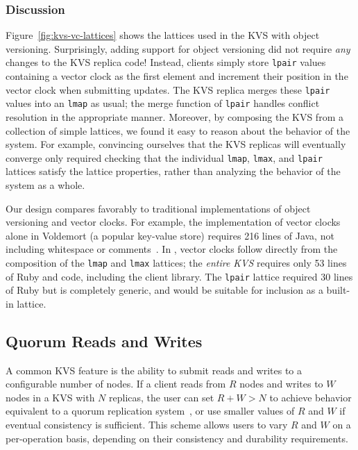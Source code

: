 \subsubsection{Discussion}
Figure~\ref{fig:kvs-vc-lattices} shows the lattices used in the KVS with object
versioning. Surprisingly, adding support for object versioning did not require
\emph{any} changes to the KVS replica code! Instead, clients simply store
\texttt{lpair} values containing a vector clock as the first element and
increment their position in the vector clock when submitting updates. The KVS
replica merges these \texttt{lpair} values into an \texttt{lmap} as usual; the
merge function of \texttt{lpair} handles conflict resolution in the appropriate
manner. Moreover, by composing the KVS from a collection of simple lattices, we
found it easy to reason about the behavior of the system. For example,
convincing ourselves that the KVS replicas will eventually converge only
required checking that the individual \texttt{lmap}, \texttt{lmax}, and
\texttt{lpair} lattices satisfy the lattice properties, rather than analyzing
the behavior of the system as a whole.

Our design compares favorably to traditional implementations of object
versioning and vector clocks. For example, the implementation of vector clocks
alone in Voldemort (a popular key-value store) requires 216 lines of Java, not
including whitespace or comments~\cite{voldemort-vector-clock}. In \lang, vector
clocks follow directly from the composition of the \texttt{lmap} and
\texttt{lmax} lattices; the \emph{entire KVS} requires only 53 lines of Ruby and \lang
code, including the client library. The \texttt{lpair} lattice required 30 lines
of Ruby but is completely generic, and would be suitable for inclusion as a
built-in lattice.  

\subsection{Quorum Reads and Writes}
A common KVS feature is the ability to submit reads and writes to a configurable
number of nodes. If a client reads from $R$ nodes and writes to $W$ nodes in a
KVS with $N$ replicas, the user can set $R + W > N$ to achieve behavior
equivalent to a quorum replication system~\cite{Gifford1979}, or use smaller
values of $R$ and $W$ if eventual consistency is sufficient. This scheme allows
users to vary $R$ and $W$ on a per-operation basis, depending on their
consistency and durability requirements.

